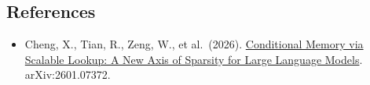 \FloatBarrier
{}
\hypertarget{references-102}{%
\subsection{References}\label{references-102}}

\vspace{0.25em}
\begin{itemize}
\tightlist
\item
  Cheng, X., Tian, R., Zeng, W., et al.~(2026). \href{https://arxiv.org/abs/2601.07372}{Conditional Memory via Scalable Lookup: A New Axis of Sparsity for Large Language Models}. arXiv:2601.07372.
\end{itemize}

\clearpage
